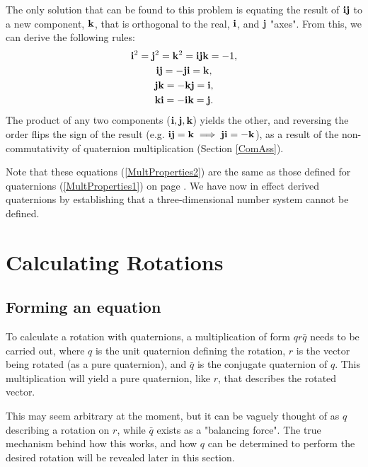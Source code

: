 \documentclass[12pt]{article}
\theoremstyle{definition}
\begin{document}
The only solution that can be found to this problem is equating the result of $\vb{ij}$ to a new component, $\vb{k}$, that is orthogonal to the real, $\vb{i}$, and $\vb{j}$ "axes". From this, we can derive the following rules:
\begin{subequations} \label{MultProperties2}
    \begin{gather}
        \vb{i}^2 = \vb{j}^2 = \vb{k}^2 = \vb{i}\vb{j}\vb{k} = -1, \\
        \vb{ij} = -\vb{ji} = \vb{k}, \\
        \vb{jk} = -\vb{kj} = \vb{i}, \\
        \vb{ki} = -\vb{ik} = \vb{j}.
    \end{gather}
\end{subequations}
The product of any two components ($\vb{i, j, k}$) yields the other, and reversing the order flips the sign of the result (e.g. $\vb{ij} = \vb{k} \implies \vb{ji} = -\vb{k}$), as a result of the non-commutativity of quaternion multiplication (Section \ref{ComAss}).

Note that these equations (\ref{MultProperties2}) are the same as those defined for quaternions (\ref{MultProperties1}) on page \pageref{MultProperties1}. We have now in effect derived quaternions by establishing that a three-dimensional number system cannot be defined.

\pagebreak
\section{Calculating Rotations}

\subsection{Forming an equation}

To calculate a rotation with quaternions, a multiplication of form $qr\bar{q}$ \cite{DRose} needs to be carried out, where $q$ is the unit quaternion defining the rotation, $r$ is the vector being rotated (as a pure quaternion), and $\bar{q}$ is the conjugate quaternion of $q$. This multiplication will yield a pure quaternion, like $r$, that describes the rotated vector.

This may seem arbitrary at the moment, but it can be vaguely thought of as $q$ describing a rotation on $r$, while $\bar{q}$ exists as a "balancing force". The true mechanism behind how this works, and how $q$ can be determined to perform the desired rotation will be revealed later in this section.
\end{document}
